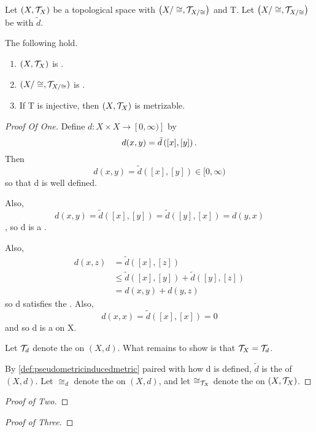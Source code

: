 \begin{prop}
    \label{prop:pseudometrizableprequotient}
    Let $(X,\mathcal{T}_X)$ be a topological space 
    with \QuotientTopologicalSpace  $\left( X/\cong, \mathcal{T}_{X/\cong}\right)$
    and \QuotientMap T. Let $\left( X/\cong, \mathcal{T}_{X/\cong}\right)$ be \Pseudometrizable with \Pseudometric $\tilde{d}$. 
    
    The following hold. 
    \begin{enumerate}
        \item  $(X,\mathcal{T}_X)$ is \Pseudometrizable. 
        \item $(X/\cong, \mathcal{T}_{X/\cong})$ is \Metrizable. 
        \item If T is injective, then $(X,\mathcal{T}_X)$ is metrizable. 
    \end{enumerate}
    \begin{proof}[Proof Of One]
        Define $d:X \times X \to [0,\infty)]$ by 
        \begin{equation*}
            d(x,y) = \tilde{d}\left( [x], [y]\right).
        \end{equation*}
        Then
        \begin{equation*}
            d(x,y) =\tilde{d}([x],[y]) \in [0,\infty)
        \end{equation*}
        so that d is well defined. 
        
        Also, 
        \begin{equation*}
            d(x,y) = \tilde{d}([x],[y])=\tilde{d}([y],[x])=d(y,x)
        \end{equation*}
        , so d is a \SymmetricMap.
        
        Also, 
        \begin{align*}
            d(x,z) & = \tilde{d}([x],[z])\\
            & \leq \tilde{d}([x],[y])+\tilde{d}([y], [z])\\
            & = d(x,y)+d(y,z)
        \end{align*}
        so d satisfies the \TriangleInequality. 
        Also, 
        \begin{equation}
            d(x,x)=\tilde{d}([x],[x])=0
        \end{equation}
        and so d is a \Pseudometric on X. 
        
        Let $\mathcal{T}_d$ denote the \PseudometricTopology on $(X,d)$. What remains to show is that $\mathcal{T}_X=\mathcal{T}_d$. 
        
        
           By \ref{def:pseudometricinducedmetric} paired with how d is defined, $\tilde{d}$ is the \PseudometricInducedMetric of $(X,d)$. Let $\cong_d$ denote the \RelationOfZeroDistance on $(X,d)$, and 
           let $\cong_{\mathcal{T}_X}$ denote the \RelationOfEqualNeighborhoodFilters on $(X,\mathcal{T}_X)$. 
           

    \end{proof} 
    \begin{proof}[Proof of Two]
    \end{proof}
    \begin{proof}[Proof of Three]
    \end{proof} 
\end{prop} 
